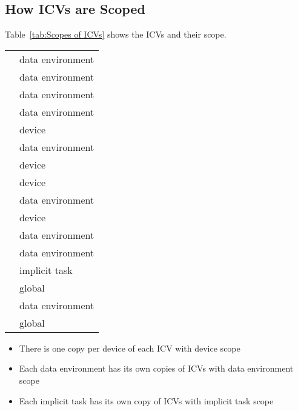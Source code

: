 \subsection{How ICVs are Scoped}
\label{subsec:How ICVs are Scoped}
Table~\ref{tab:Scopes of ICVs} shows the ICVs and their scope.
\renewcommand{\arraystretch}{1.3}
\tablelasttail{\hline}
\begin{supertabular}{p{1.5in} p{2.5in}}
 & data environment\\
 & data environment\\
 & data environment\\
 & data environment\\
 & device\\
 & data environment\\
 & device\\
 & device\\
 & data environment\\
 & device\\
 & data environment\\
 & data environment\\
 & implicit task\\
 & global\\
 & data environment\\
 & global\\
\end{supertabular}
\renewcommand{\arraystretch}{1.5} %

\comments
\begin{itemize}
\item There is one copy per device of each ICV with device scope

\item Each data environment has its own copies of ICVs with data environment scope

\item Each implicit task has its own copy of ICVs with implicit task scope 
\end{itemize}

